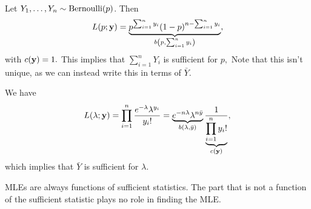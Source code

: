 \begin{eg}
Let $Y_1,\ldots,Y_n\sim \operatorname*{Bernoulli}(p)$. Then 
$$
L(p;\mathbf y)=\underbrace{p^{\sum^n_{i=1}y_i}(1-p)^{n-\sum^n_{i=1}y_i}}_{b\left(p,\sum^n_{i=1}y_i\right)},
$$
with $c(\mathbf y)=1.$ This implies that $\sum^n_{i=1}Y_i$ is sufficient for $p,$ Note that this isn't unique, as we can instead write this in terms of $\bar Y.$
\end{eg}

\begin{eg}
We have
$$
L(\lambda;\mathbf y)=\prod^n_{i=1}\frac{e^{-\lambda}\lambda^{y_i}}{y_i!}=\underbrace{e^{-n\lambda}\lambda^{n\bar y}}_{b(\lambda,\bar y)}\frac{1}{\underbrace{\prod^n_{i=1}y_i!}_{c(\mathbf y)}},
$$
which implies that $\bar Y$ is sufficient for $\lambda.$ \end{eg}

MLEs are always functions of sufficient statistics. The part that is not a function of the sufficient statistic plays no role in finding the MLE.

